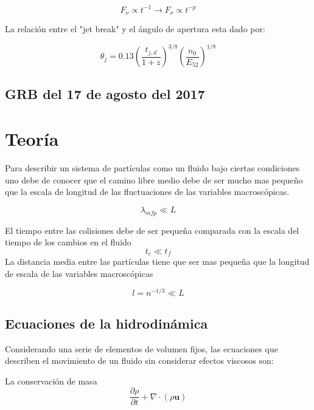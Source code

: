 \documentclass[12pt,a4paper]{book}
\begin{document}
\begin{equation}
F_\nu \propto t^{-1} \longrightarrow F_\nu \propto t^{-p}
\end{equation}

La relación entre el "jet break" y el ángulo de apertura esta dado por:

\begin{equation}
\theta_j = 0.13 \left( \frac{t_{j,d}}{1+z} \right)^{3/8}
\left(\frac{n_0}{E_{52}} \right)^{1/8}
\end{equation}

\section{GRB del 17 de agosto del 2017}
%
\chapter{Teoría}
Para describir un sistema de partículas como un fluido bajo ciertas condiciones uno debe de conocer que el camino libre medio debe de ser mucho mas pequeño que la escala de longitud de las fluctuaciones de las variables macroscópicas.

\begin{equation}
\lambda_{mfp} \ll L
\end{equation}

El tiempo entre las colisiones debe de ser pequeña comparada con la escala del tiempo de los cambios en el fluido
\begin{equation}
t_{c} \ll t_f
\end{equation}
La distancia media entre las partículas tiene que ser mas pequeña que la longitud de escala de las variables macroscópicas

\begin{equation}
l = n^{-1/3} \ll L
\end{equation}



\section{Ecuaciones de la hidrodinámica}

Considerando una serie de elementos de volumen fijos, las ecuaciones que describen el movimiento de un fluido sin considerar efectos viscosos son:

La conservación de masa
\begin{equation} \label{conservación_masa_hidrodinamica}
\dfrac{\partial \rho }{\partial t} + \nabla \cdot \left( \rho \mathbf{u} \right)
\end{equation}
\end{document}
